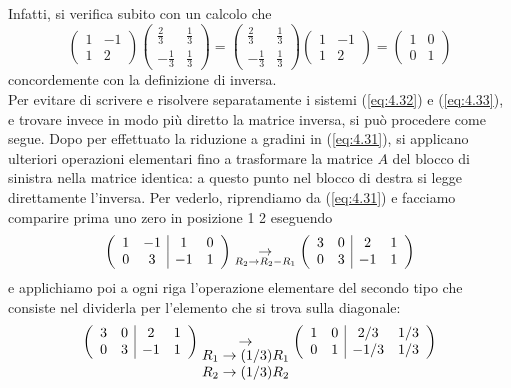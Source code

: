 \documentclass{book}
\begin{document}
Infatti, si verifica subito con un calcolo che 
\begin{equation*}
  \begin{pmatrix}
    1 & -1\\
    1 & 2
  \end{pmatrix}
  \begin{pmatrix}
     \frac{2}{3} &\frac{1}{3}\\
    -\frac{1}{3} & \frac{1}{3}
  \end{pmatrix}=
   \begin{pmatrix}
     \frac{2}{3} &\frac{1}{3}\\
    -\frac{1}{3} & \frac{1}{3}
   \end{pmatrix}
   \begin{pmatrix}
    1 & -1\\
    1 & 2
   \end{pmatrix}=
   \begin{pmatrix}
     1 &0\\
     0 &1
   \end{pmatrix} 
\end{equation*}
concordemente con la definizione di inversa.\\
Per evitare di scrivere e risolvere separatamente i sistemi (\ref{eq:4.32}) e (\ref{eq:4.33}), e trovare invece in
modo più diretto la matrice inversa, si può procedere come segue. Dopo per effettuato la riduzione a gradini in
(\ref{eq:4.31}), si applicano ulteriori operazioni elementari fino a trasformare la matrice $A$ del blocco di
sinistra nella matrice identica: a questo punto nel blocco di destra si legge direttamente l'inversa. Per vederlo,
riprendiamo da (\ref{eq:4.31}) e facciamo comparire prima uno zero in posizione 1 2 eseguendo
\begin{equation*}
  \left(
  \begin{array}{cc|cc}
    1&-1&1&0\\
    0&3&-1&1
  \end{array}\right) \underset{R_2\to R_2-R_1}{\to} \left(
  \begin{array}[center]{cc|cc}
    3 & 0 & 2 &1\\
    0 & 3 & -1 &1
  \end{array}\right)
\end{equation*}
e applichiamo poi a ogni riga l'operazione elementare del secondo tipo che consiste nel dividerla per l'elemento
che si trova sulla diagonale:
\begin{equation}
  \label{eq:4.34}
  \left(
  \begin{array}[center]{cc|cc}
    3 & 0 & 2 &1\\
    0 & 3 & -1 &1
  \end{array}\right)
\underset{
  \begin{matrix}
    R_1\to (1/3) R_1\\ R_2\to(1/3) R_2
  \end{matrix}}{\to}
  \left(
  \begin{array}[center]{cc|cc}
    1 & 0 & 2/3 &1/3\\
    0 & 1 & -1/3 &1/3
  \end{array}\right) 
\end{equation}
\end{document}
